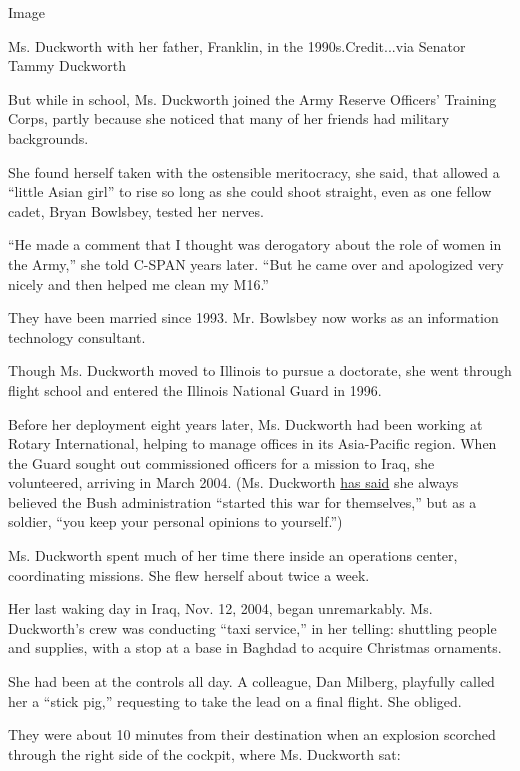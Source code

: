 Image

Ms. Duckworth with her father, Franklin, in the 1990s.Credit...via
Senator Tammy Duckworth

But while in school, Ms. Duckworth joined the Army Reserve Officers'
Training Corps, partly because she noticed that many of her friends had
military backgrounds.

She found herself taken with the ostensible meritocracy, she said, that
allowed a ``little Asian girl'' to rise so long as she could shoot
straight, even as one fellow cadet, Bryan Bowlsbey, tested her nerves.

``He made a comment that I thought was derogatory about the role of
women in the Army,'' she told C-SPAN years later. ``But he came over and
apologized very nicely and then helped me clean my M16.''

They have been married since 1993. Mr. Bowlsbey now works as an
information technology consultant.

Though Ms. Duckworth moved to Illinois to pursue a doctorate, she went
through flight school and entered the Illinois National Guard in 1996.

Before her deployment eight years later, Ms. Duckworth had been working
at Rotary International, helping to manage offices in its Asia-Pacific
region. When the Guard sought out commissioned officers for a mission to
Iraq, she volunteered, arriving in March 2004. (Ms. Duckworth
\href{https://www.wbez.org/stories/ep-106-sen-tammy-duckworth/aa3e6284-2b53-44e5-9312-83e82aef723a}{has
said} she always believed the Bush administration ``started this war for
themselves,'' but as a soldier, ``you keep your personal opinions to
yourself.'')

Ms. Duckworth spent much of her time there inside an operations center,
coordinating missions. She flew herself about twice a week.

Her last waking day in Iraq, Nov. 12, 2004, began unremarkably. Ms.
Duckworth's crew was conducting ``taxi service,'' in her telling:
shuttling people and supplies, with a stop at a base in Baghdad to
acquire Christmas ornaments.

She had been at the controls all day. A colleague, Dan Milberg,
playfully called her a ``stick pig,'' requesting to take the lead on a
final flight. She obliged.

They were about 10 minutes from their destination when an explosion
scorched through the right side of the cockpit, where Ms. Duckworth sat:

